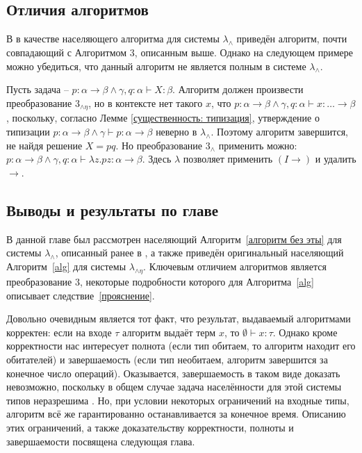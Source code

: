 \documentclass[../main.tex]{subfiles}
\begin{document}
\subsection{Отличия алгоритмов}

В \cite{kusmierek_07} в качестве населяющего алгоритма для системы $\lambda_\wedge$ приведён алгоритм, почти совпадающий с Алгоритмом 3, описанным выше. Однако на следующем примере можно убедиться, что данный алгоритм не является полным в системе $\lambda_\wedge$.

Пусть задача -- $p \colon \alpha \to \beta \wedge \gamma, q \colon \alpha \vdash X \colon \beta$. Алгоритм должен произвести преобразование $3_{\wedge \eta}$, но в контексте нет такого $x$, что $p \colon \alpha \to \beta \wedge \gamma, q \colon \alpha \vdash x \colon \dots \to \beta$, поскольку, согласно Лемме \ref{существенность: типизация}, утверждение о типизации $p \colon \alpha \to \beta \wedge \gamma \vdash p \colon \alpha \to \beta$ неверно в $\lambda_\wedge$. Поэтому алгоритм завершится, не найдя решение $X = pq$. 
Но преобразование $3_\wedge$ применить можно: $p \colon \alpha \to \beta \wedge \gamma, q \colon \alpha \vdash \lambda z . pz \colon \alpha \to \beta$. Здесь $\lambda$ позволяет применить $(I \to)$ и удалить $\to$.

\subsection{Выводы и результаты по главе}

В данной главе был рассмотрен населяющий Алгоритм~\ref{алгоритм без эты} для системы $\lambda_\wedge$, описанный ранее в \cite{kusmierek_07}, а также приведён оригинальный населяющий Алгоритм~\ref{alg} для системы $\lambda_{\wedge \eta}$. Ключевым отличием алгоритмов является преобразование $3$, некоторые подробности которого для Алгоритма~\ref{alg} описывает следствие~\ref{прояснение}.

Довольно очевидным является тот факт, что результат, выдаваемый алгоритмами корректен: если на входе $\tau$ алгоритм выдаёт терм $x$, то $\emptyset \vdash x \colon \tau$. Однако кроме корректности нас интересует полнота (если тип обитаем, то алгоритм находит его обитателей) и завершаемость (если тип необитаем, алгоритм завершится за конечное число операций). Оказывается, завершаемость в таком виде доказать невозможно, поскольку в общем случае задача населённости для этой системы типов неразрешима \cite{urzyczyn_99}. Но, при условии некоторых ограничений на входные типы, алгоритм всё же гарантированно останавливается за конечное время. Описанию этих ограничений, а также доказательству корректности, полноты и завершаемости посвящена следующая глава.
\end{document}
